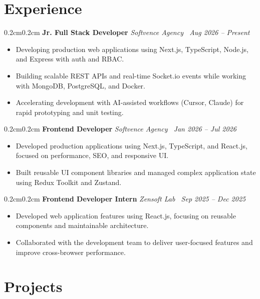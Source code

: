\documentclass[10pt, a4paper]{article}
\newenvironment{highlights}{\begin{itemize}[topsep=0.03cm, parsep=0.03cm, partopsep=0pt, itemsep=0pt, leftmargin=10pt]}{\end{itemize}}
\newenvironment{onecolentry}{\begin{adjustwidth}{0.2cm}{0.2cm}}{\end{adjustwidth}}
\begin{document}
\section{Experience}

\begin{onecolentry}
\textbf{Jr. Full Stack Developer} \hfill \textit{Softvence Agency \textbar\ Aug 2026 -- Present}
\begin{highlights}
\item Developing production web applications using Next.js, TypeScript, Node.js, and Express with auth and RBAC.
\item Building scalable REST APIs and real-time Socket.io events while working with MongoDB, PostgreSQL, and Docker.
\item Accelerating development with AI-assisted workflows (Cursor, Claude) for rapid prototyping and unit testing.
\end{highlights}
\end{onecolentry}

\begin{onecolentry}
\textbf{Frontend Developer} \hfill \textit{Softvence Agency \textbar\ Jan 2026 -- Jul 2026}
\begin{highlights}
\item Developed production applications using Next.js, TypeScript, and React.js, focused on performance, SEO, and responsive UI.
\item Built reusable UI component libraries and managed complex application state using Redux Toolkit and Zustand.
\end{highlights}
\end{onecolentry}

\begin{onecolentry}
\textbf{Frontend Developer Intern} \hfill \textit{Zensoft Lab \textbar\ Sep 2025 -- Dec 2025}
\begin{highlights}
\item Developed web application features using React.js, focusing on reusable components and maintainable architecture.
\item Collaborated with the development team to deliver user-focused features and improve cross-browser performance.
\end{highlights}
\end{onecolentry}

\section{Projects}
\end{document}
